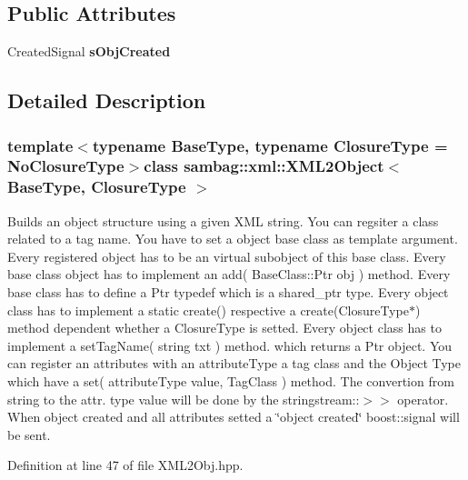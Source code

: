 \subsection*{Public Attributes}
\begin{DoxyCompactItemize}
\item 
\hypertarget{classsambag_1_1xml_1_1_x_m_l2_object_afb74f9adf5469285cee91505d1f860f5}{
CreatedSignal {\bfseries sObjCreated}}
\label{classsambag_1_1xml_1_1_x_m_l2_object_afb74f9adf5469285cee91505d1f860f5}

\end{DoxyCompactItemize}


\subsection{Detailed Description}
\subsubsection*{template$<$typename BaseType, typename ClosureType = NoClosureType$>$class sambag::xml::XML2Object$<$ BaseType, ClosureType $>$}

Builds an object structure using a given XML string. You can regsiter a class related to a tag name. You have to set a object base class as template argument. Every registered object has to be an virtual subobject of this base class. Every base class object has to implement an add( BaseClass::Ptr obj ) method. Every base class has to define a Ptr typedef which is a shared\_\-ptr type. Every object class has to implement a static create() respective a create(ClosureType$\ast$) method dependent whether a ClosureType is setted. Every object class has to implement a setTagName( string txt ) method. which returns a Ptr object. You can register an attributes with an attributeType a tag class and the Object Type which have a set( attributeType value, TagClass ) method. The convertion from string to the attr. type value will be done by the stringstream::$>$$>$ operator. When object created and all attributes setted a \char`\"{}object created\char`\"{} boost::signal will be sent. 

Definition at line 47 of file XML2Obj.hpp.



